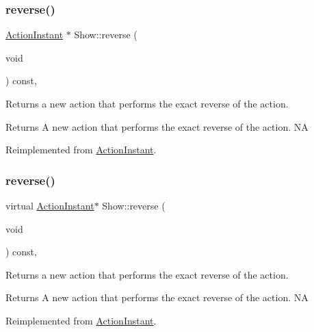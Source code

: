 \subsubsection{\texorpdfstring{reverse()}{reverse()}\hspace{0.1cm}{\footnotesize\ttfamily [1/2]}}
{\footnotesize\ttfamily \hyperlink{classActionInstant}{Action\+Instant} $\ast$ Show\+::reverse (\begin{DoxyParamCaption}\item[{void}]{ }\end{DoxyParamCaption}) const\hspace{0.3cm}{\ttfamily [override]}, {\ttfamily [virtual]}}

Returns a new action that performs the exact reverse of the action.

\begin{DoxyReturn}{Returns}
A new action that performs the exact reverse of the action.  NA 
\end{DoxyReturn}


Reimplemented from \hyperlink{classActionInstant_aeb1870802c509e1f4111c863a28e9262}{Action\+Instant}.

\mbox{\label{classShow_a0fdc7cbefad3afaecfc0b8fdc71e9814}} 
\subsubsection{\texorpdfstring{reverse()}{reverse()}\hspace{0.1cm}{\footnotesize\ttfamily [2/2]}}
{\footnotesize\ttfamily virtual \hyperlink{classActionInstant}{Action\+Instant}$\ast$ Show\+::reverse (\begin{DoxyParamCaption}\item[{void}]{ }\end{DoxyParamCaption}) const\hspace{0.3cm}{\ttfamily [override]}, {\ttfamily [virtual]}}

Returns a new action that performs the exact reverse of the action.

\begin{DoxyReturn}{Returns}
A new action that performs the exact reverse of the action.  NA 
\end{DoxyReturn}


Reimplemented from \hyperlink{classActionInstant_aeb1870802c509e1f4111c863a28e9262}{Action\+Instant}.

